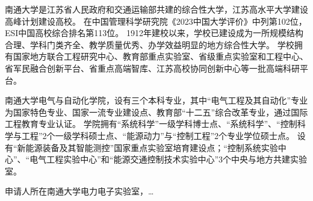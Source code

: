 \justifying
\NSFCBodyText

南通大学是江苏省人民政府和交通运输部共建的综合性大学，江苏高水平大学建设高峰计划建设高校。
在中国管理科学研究院《2023中国大学评价》中列第102位，ESI中国高校综合排名第113位。
1912年建校以来，学校已建设成为一所规模结构合理、学科门类齐全、教学质量优秀、办学效益明显的地方综合性大学。
学校拥有国家地方联合工程研究中心、教育部重点实验室、省级重点实验室和工程中心、省军民融合创新平台、省重点高端智库、江苏高校协同创新中心等一批高端科研平台。

南通大学电气与自动化学院，设有三个本科专业，其中“电气工程及其自动化”专业为国家特色专业、国家一流专业建设点、教育部“十二五”综合改革专业，通过国际工程教育专业认证。
学院拥有“系统科学”一级学科博士点、“系统科学”、“控制科学与工程”2个一级学科硕士点、“能源动力”与“控制工程”2个专业学位硕士点。
设有“新能源装备及其智能测控”国家重点实验室培育建设点；“控制系统实验中心”、“电气工程实验中心”和“能源交通控制技术实验中心”3个中央与地方共建实验室。


申请人所在南通大学电力电子实验室，\dots